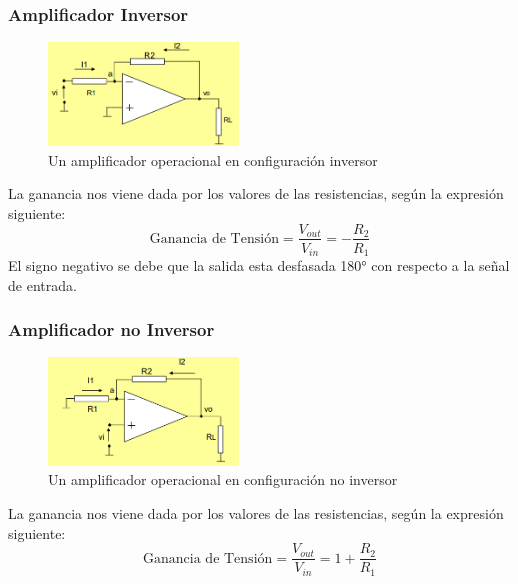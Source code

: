 \documentclass[../main.tex]{subfiles}
\begin{document}
		\subsubsection{Amplificador Inversor}
		\begin{figure}[H]
			\centering
			\includegraphics[width=0.45\textwidth]{imagen3.png}
			\caption{Un amplificador operacional en configuración inversor}
		\end{figure}
		La ganancia nos viene dada por los valores de las resistencias, según la expresión
		siguiente:
		\[
			\text{Ganancia de Tensión} = \dfrac{V_{out}}{V_{in}} = - \dfrac{R_2}{R_1}
		\]
		El signo negativo se debe que la salida esta desfasada 180° con respecto a la señal
		de entrada.

		\subsubsection{Amplificador no Inversor}
		\begin{figure}[H]
			\centering
			\includegraphics[width=0.45\textwidth]{imagen4.png}
			\caption{Un amplificador operacional en configuración no inversor}
		\end{figure}
		La ganancia nos viene dada por los valores de las resistencias, según la expresión
		siguiente:
		\[
		\text{Ganancia de Tensión} = \dfrac{V_{out}}{V_{in}} = 1 + \dfrac{R_2}{R_1}
		\]

\end{document}
